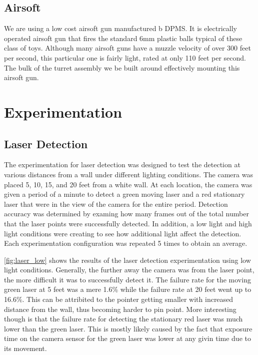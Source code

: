 \documentclass[10pt,twocolumn,letterpaper]{article}
\begin{document}
\subsection{Airsoft}
We are using a low cost airsoft gun manufactured b DPMS. It is electrically operated airsoft gun that fires the standard 6mm plastic balls typical of these class of toys. Although many airsoft guns have a muzzle velocity of over 300 feet per second, this particular one is fairly light, rated at only 110 feet per second. The bulk of the turret assembly we be built around effectively mounting this airsoft gun.


\section{Experimentation}

\subsection{Laser Detection}

The experimentation for laser detection was designed to test the detection at various distances from a wall under different lighting conditions. The camera was placed 5, 10, 15, and 20 feet from a white wall. At each location, the camera was given a period of a minute to detect a green moving laser and a red stationary laser that were in the view of the camera for the entire period. Detection accuracy was determined by examing how many frames out of the total number that the laser points were successfully detected. In addition, a low light and high light conditions were creating to see how additional light affect the detection. Each experimentation configuration was repeated 5 times to obtain an average.

\ref{fig:laser_low} shows the results of the laser detection experimentation using low light conditions. Generally, the further away the camera was from the laser point, the more difficult it was to successfully detect it. The failure rate for the moving green laser at 5 feet was a mere 1.6\% while the failure rate at 20 feet went up to 16.6\%. This can be attribited to the pointer getting smaller with increased distance from the wall, thus becoming harder to pin point. More interesting though is that the failure rate for detecting the stationary red laser was much lower than the green laser. This is mostly likely caused by the fact that exposure time on the camera sensor for the green laser was lower at any givin time due to its movement.  
\end{document}
